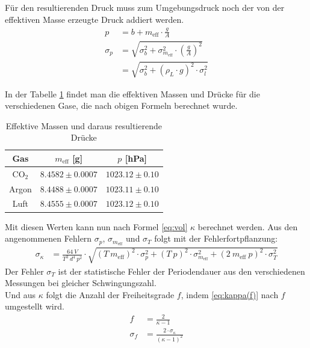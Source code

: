 \documentclass[12pt,a4paper,titlepage,headinclude,bibtotoc]{scrartcl}
\begin{document}
Für den resultierenden Druck muss zum Umgebungsdruck noch der von der effektiven Masse erzeugte Druck addiert werden.
\begin{align}
	p &= b + m_{\text{eff}} \cdot \frac{g}{A}\\
	\sigma_p &= \sqrt{\sigma_b^2+\sigma_{m_{\text{eff}}}^2 \cdot \left(\frac{g}{A}\right)^2}\\
	&=\sqrt{\sigma_b^2+\left(\rho_L \cdot g\right)^2 \cdot \sigma_l^2 }
\end{align}

In der Tabelle \ref{tab:RuechardtMasseDruck} findet man die effektiven Massen und Drücke für die verschiedenen Gase, die nach obigen Formeln berechnet wurde.
\begin{table}[!hbt]
	\centering
	\begin{tabular}{|c|c|c|}
		\hline
		Gas & $m_{\text{eff}}$ [g] & $p$ [hPa] \\
		\hline
		\hline
		CO$_2$ & $8.4582 \pm 0.0007$ & $1023.12 \pm 0.10$ \\
		Argon & $8.4488 \pm 0.0007$ & $1023.11 \pm 0.10$ \\
		Luft & $8.4555 \pm 0.0007$ & $1023.12 \pm 0.10$ \\
		\hline
	\end{tabular}
	\caption{Effektive Massen und daraus resultierende Drücke}
	\label{tab:RuechardtMasseDruck}
\end{table}

Mit diesen Werten kann nun nach Formel \eqref{eq:vol} $\kappa$ berechnet werden.
Aus den angenommenen Fehlern $\sigma_p$, $\sigma_{m_\text{eff}}$ und $\sigma_T$ folgt mit der Fehlerfortpflanzung:
\begin{align}
	\sigma_{\kappa}&=\frac{64 ~ V}{T^{3} ~ d^{4} ~ p^{2}} \cdot \sqrt{\left(T ~ m_{\text{eff}}\right)^2 \cdot \sigma_{p}^{2} + \left(T ~ p\right)^2 \cdot \sigma_{m_{\text{eff}}}^{2} + \left(2~m_{\text{eff}}~p\right)^{2} \cdot \sigma_{T}^{2}}
\end{align}
Der Fehler $\sigma_T$ ist der statistische Fehler der Periodendauer aus den verschiedenen Messungen bei gleicher Schwingungszahl.\\
Und aus $\kappa$ folgt die Anzahl der Freiheitsgrade $f$, indem \eqref{eq:kappa(f)} nach $f$ umgestellt wird.
\begin{align}
	f&=\frac{2}{\kappa - 1}\\
	\sigma_{f}&=\frac{2 \cdot \sigma_{\kappa}}{\left(\kappa - 1\right)^{2}}
\end{align}
\end{document}
